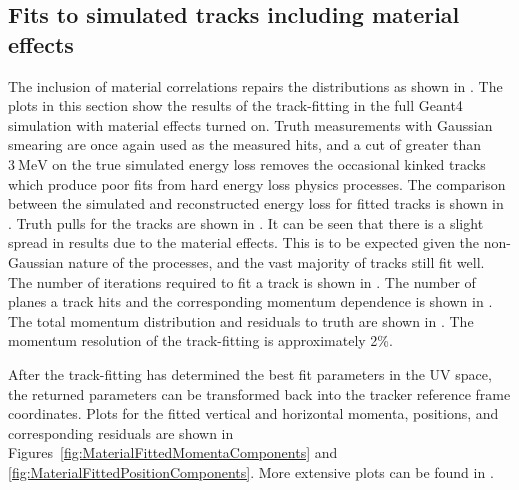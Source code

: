 

\subsection{Fits to simulated tracks including material effects}

The inclusion of material correlations repairs the \chisq distributions as shown in . The plots in this section show the results of the track-fitting in the full \gmtwo Geant4 simulation with material effects turned on. Truth measurements with  Gaussian smearing are once again used as the measured hits, and a cut of greater than $\SI{3}{\MeV}$ on the true simulated energy loss removes the occasional kinked tracks which produce poor fits from hard energy loss physics processes. The comparison between the simulated and reconstructed energy loss for fitted tracks is shown in . Truth pulls for the tracks are shown in . It can be seen that there is a slight spread in results due to the material effects. This is to be expected given the non-Gaussian nature of the processes, and the vast majority of tracks still fit well. The number of iterations required to fit a track is shown in . The number of planes a track hits and the corresponding momentum dependence is shown in . The total momentum distribution and residuals to truth are shown in . The momentum resolution of the track-fitting is approximately 2\%.


After the track-fitting has determined the best fit parameters in the UV space, the returned parameters can be transformed back into the tracker reference frame coordinates. Plots for the fitted vertical and horizontal momenta, positions, and corresponding residuals are shown in Figures~\ref{fig:MaterialFittedMomentaComponents} and \ref{fig:MaterialFittedPositionComponents}. More extensive plots can be found in .


